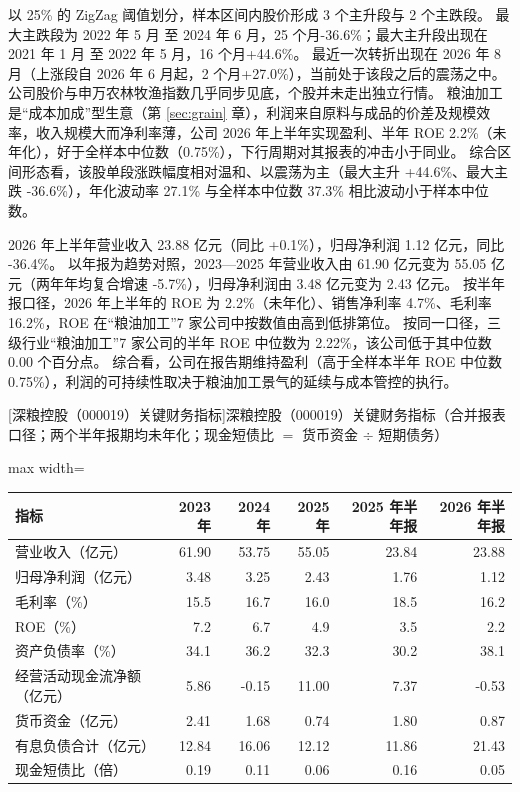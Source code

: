  以 25\% 的 ZigZag 阈值划分，样本区间内股价形成 3 个主升段与 2 个主跌段。 最大主跌段为 2022 年 5 月 至 2024 年 6 月，25 个月-36.6\%；最大主升段出现在 2021 年 1 月 至 2022 年 5 月，16 个月+44.6\%。 最近一次转折出现在 2026 年 8 月（上涨段自 2026 年 6 月起，2 个月+27.0\%），当前处于该段之后的震荡之中。 公司股价与申万农林牧渔指数几乎同步见底，个股并未走出独立行情。 粮油加工是“成本加成”型生意（第 \ref{sec:grain} 章），利润来自原料与成品的价差及规模效率，收入规模大而净利率薄，公司 2026 年上半年实现盈利、半年 ROE 2.2\%（未年化），好于全样本中位数（0.75\%），下行周期对其报表的冲击小于同业。 综合区间形态看，该股单段涨跌幅度相对温和、以震荡为主（最大主升 +44.6\%、最大主跌 -36.6\%），年化波动率 27.1\% 与全样本中位数 37.3\% 相比波动小于样本中位数。

 2026 年上半年营业收入 23.88 亿元（同比 +0.1\%），归母净利润 1.12 亿元，同比 -36.4\%。 以年报为趋势对照，2023---2025 年营业收入由 61.90 亿元变为 55.05 亿元（两年年均复合增速 -5.7\%），归母净利润由 3.48 亿元变为 2.43 亿元。 按半年报口径，2026 年上半年的 ROE 为 2.2\%（未年化）、销售净利率 4.7\%、毛利率 16.2\%，ROE 在“粮油加工”7 家公司中按数值由高到低排第位。 按同一口径，三级行业“粮油加工”7 家公司的半年 ROE 中位数为 2.22\%，该公司低于其中位数 0.00 个百分点。 综合看，公司在报告期维持盈利（高于全样本半年 ROE 中位数 0.75\%），利润的可持续性取决于粮油加工景气的延续与成本管控的执行。

\begin{center}\small\setlength{\tabcolsep}{3.4pt}
[深粮控股（000019）关键财务指标]{深粮控股（000019）关键财务指标（合并报表口径；两个半年报期均未年化；现金短债比 $=$ 货币资金 $\div$ 短期债务）}
\begin{adjustbox}{max width=\textwidth}
\begin{tabular}{@{}lrrrrr@{}}
\toprule
指标 & 2023 年 & 2024 年 & 2025 年 & 2025 年半年报 & 2026 年半年报 \\
\midrule
营业收入（亿元） & 61.90 & 53.75 & 55.05 & 23.84 & 23.88 \\
归母净利润（亿元） & 3.48 & 3.25 & 2.43 & 1.76 & 1.12 \\
毛利率（\%） & 15.5 & 16.7 & 16.0 & 18.5 & 16.2 \\
ROE（\%） & 7.2 & 6.7 & 4.9 & 3.5 & 2.2 \\
资产负债率（\%） & 34.1 & 36.2 & 32.3 & 30.2 & 38.1 \\
经营活动现金流净额（亿元） & 5.86 & -0.15 & 11.00 & 7.37 & -0.53 \\
货币资金（亿元） & 2.41 & 1.68 & 0.74 & 1.80 & 0.87 \\
有息负债合计（亿元） & 12.84 & 16.06 & 12.12 & 11.86 & 21.43 \\
现金短债比（倍） & 0.19 & 0.11 & 0.06 & 0.16 & 0.05 \\
\bottomrule
\end{tabular}
\end{adjustbox}
\end{center}

